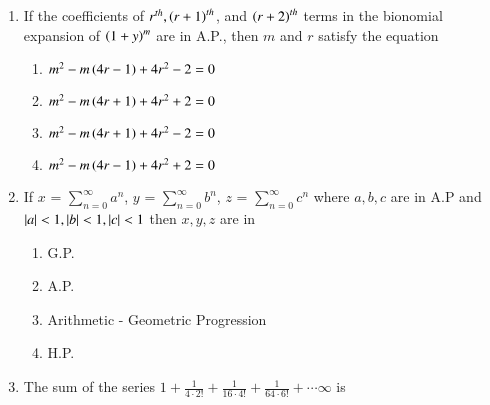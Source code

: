 \documentclass[journal,12pt,twocolumn]{IEEEtran}
\theoremstyle{remark}
\begin{document}
\begin{enumerate}[label={\arabic*.}]
\begin{enumerate}[label={\brak{\alph*}}]
\end{enumerate}

\item {If the coefficients of $r^{th}, \left(r+1\right)^{th}$, and $\left(r+2\right)^{th}$ terms in the bionomial expansion of $\left(1+y\right)^m$ are in A.P., then $m$ and $r$ satisfy the equation}

{\hfill{}} 
\begin{enumerate}[label={\brak{\alph*}}]

\item  {$m^2-m\left(4r-1\right)+4r^2-2=0$}
\item  {$m^2-m\left(4r+1\right)+4r^2+2=0$}
\item  {$m^2-m\left(4r+1\right)+4r^2-2=0$}
\item  {$m^2-m\left(4r-1\right)+4r^2+2=0$}

\end{enumerate}

\item {If $x$ = $\sum\limits_{n=0}^{\infty}a^n$, $y$ = $\sum\limits_{n=0}^{\infty}b^n$, $z$ = $\sum\limits_{n=0}^{\infty}c^n$ where $a,b,c$ are in A.P and $\left\vert a\right\vert<1,\left\vert b\right\vert<1,\left\vert c\right\vert<1$ then $x,y,z$ are in}
{\hfill{}} 
\begin{enumerate}[label={\brak{\alph*}}]

\item  {G.P.}
\item  {A.P.}
\item  {Arithmetic - Geometric Progression}
\item  {H.P.}

\end{enumerate}

\item {The sum of the series $1+\frac{1}{4\cdot2!}+\frac{1}{16\cdot4!}+\frac{1}{64\cdot6!}+\cdots  \infty$ is}
{\hfill{}} 
\begin{enumerate}[label={\brak{\alph*}}]
\end{enumerate}


\end{enumerate}
\end{document}
